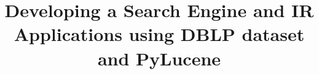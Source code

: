 \documentclass{sig-alternate-05-2015}
\begin{document}






%

\title{Developing a Search Engine and IR Applications using DBLP dataset and PyLucene}
%
%
%
%
%
\end{document}
